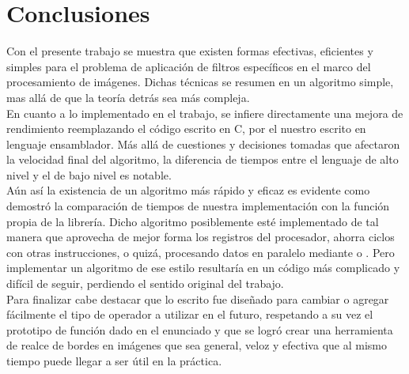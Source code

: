 \section{Conclusiones}

Con el presente trabajo se muestra que existen formas efectivas, eficientes y simples para el problema de aplicaci\'on 
de filtros espec\'ificos en el marco del procesamiento de im\'agenes. Dichas t\'ecnicas se resumen en un algoritmo simple, 
mas all\'a de que la teor\'ia detr\'as sea m\'as compleja. \\

En cuanto a lo implementado en el trabajo, se infiere directamente una mejora de rendimiento reemplazando el c\'odigo 
escrito en C, por el nuestro escrito en lenguaje ensamblador. M\'as all\'a de cuestiones  y decisiones tomadas que 
afectaron la velocidad final del algoritmo, la diferencia de tiempos entre el lenguaje de alto nivel y el de bajo 
nivel es notable. \\

A\'un as\'i la existencia de un algoritmo m\'as r\'apido y eficaz es evidente como demostr\'o la comparaci\'on de tiempos de 
nuestra implementaci\'on con la funci\'on propia de la librer\'ia. Dicho algoritmo posiblemente est\'e implementado de tal 
manera que aprovecha de mejor forma los registros del procesador, ahorra ciclos con otras instrucciones, o quiz\'a, 
procesando datos en paralelo mediante  o . Pero implementar un algoritmo de ese estilo resultar\'ia en un c\'odigo m\'as 
complicado y dif\'icil de seguir, perdiendo el sentido original del trabajo. \\

Para finalizar cabe destacar que lo escrito fue dise\~nado para cambiar o agregar f\'acilmente el tipo de operador a 
utilizar en el futuro, respetando a su vez el prototipo de funci\'on dado en el enunciado y que se logr\'o crear una 
herramienta de realce de bordes en im\'agenes que sea general, veloz y efectiva  que al mismo tiempo puede llegar a 
ser \'util en la pr\'actica.
\pagebreak

